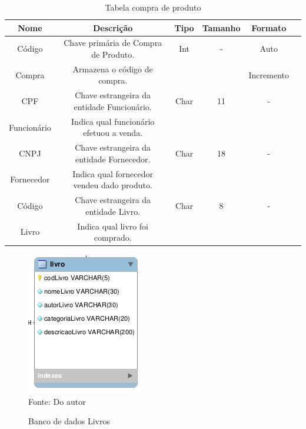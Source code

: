 \begin{table}[H]
\caption{Tabela compra de produto}
\begin{center}
\begin{tabular}{|c|c|c|c|c|c|}
\hline
Nome & Descrição & Tipo & Tamanho & Formato \\ \hline
Código & Chave primária de Compra de Produto. & Int & - & Auto \\ 
Compra & Armazena o código de compra.         &         &   & Incremento\\ \hline
CPF  & Chave estrangeira da entidade Funcionário. & Char & 11 & - \\ 
Funcionário & Indica qual funcionário efetuou a venda.   &       &    &  \\ \hline
CNPJ & Chave estrangeira da entidade Fornecedor.    & Char & 18 & - \\ 
Fornecedor & Indica qual fornecedor vendeu dado produto. &       &    & \\ \hline
Código & Chave estrangeira da entidade Livro.& Char & 8 & - \\ 
Livro  & Indica qual livro foi comprado.     &       &   &   \\ \hline
\end{tabular}
\end{center}
\label{tabela_compra_produto}
\end{table}


\begin{figure}[H]
	\centering 
	\caption{Banco de dados Livros}
	\label{banco_de_dados}
	\includegraphics[scale = 0.8]{imagens/bd-livro.png}
	\\Fonte: Do autor
\end{figure}

